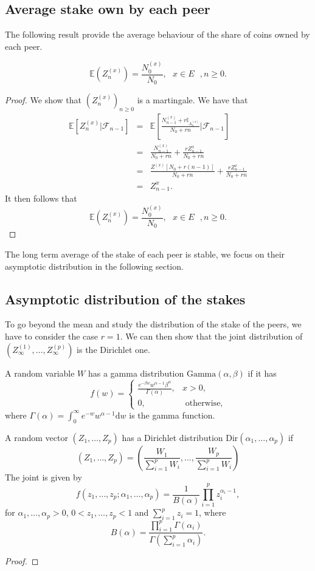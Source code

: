 \subsection{Average stake own by each peer}
The following result provide the average behaviour of the share of coins owned by each peer.
\begin{prop}\label{prop:average_stakes}
$$
\mathbb{E}(Z_n^{(x)}) = \frac{N_0^{(x)}}{N_0},\text{ }x\in E\text{ }, n\geq0.
$$
\end{prop}
\begin{proof}
We show that $(Z_n^{(x)})_{n\geq0}$ is a martingale. We have that 
\begin{eqnarray*}
\mathbb{E}\left[Z_n^{(x)}|\mathcal{F}_{n-1}\right]&=& \mathbb{E}\left[\frac{N^{(x)}_{n-1} + r\mathbb{I}_{A_n^{(x)}}}{N_0 + rn}\Big \rvert\mathcal{F}_{n-1}\right]\\
&=& \frac{N^{(x)}_{n-1} }{N_0 + rn}+\frac{rZ_{n-1}^{x}}{N_0 + rn}\\\
&=& \frac{Z^{(x)}[N_0 + r(n-1)]}{N_0 + rn}+\frac{rZ_{n-1}^{x}}{N_0 + rn}\\
&=&Z_{n-1}^{x}.
\end{eqnarray*}
It then follows that 
$$
\mathbb{E}(Z_n^{(x)}) = \frac{N_0^{(x)}}{N_0},\text{ }x\in E\text{ }, n\geq0.
$$
\end{proof}
The long term average of the stake of each peer is stable, we focus on their asymptotic distribution in the following section.
\subsection{Asymptotic distribution of the stakes}\label{ssec:stakes_distribution}
To go beyond the mean and study the distribution of the stake of the peers, we have to consider the case $r = 1$. We can then show that the joint distribution of $(Z_\infty^{(1)},\ldots,  Z_\infty^{(p)})$ is the Dirichlet one. 
\begin{definition}\label{def:dirichlet}
A random variable $W$ has a gamma distribution $\text{Gamma}(\alpha,\beta)$ if it has \pdf
\[
f(w) = 
\begin{cases}
\frac{e^{-\beta w}w^{\alpha-1}\beta^{\alpha}}{\Gamma(\alpha)},& x>0, \\
0,&\text{ otherwise}, 
\end{cases}
\]
where $\Gamma(\alpha) = \int_0^{\infty}e^{-w}w^{\alpha-1}\text{d}w$ is the gamma function.
\end{definition}
\begin{definition}\label{def:dirichlet}
A random vector $(Z_1,\ldots, Z_p)$ has a Dirichlet distribution $\text{Dir}(\alpha_1,\ldots, \alpha_p)$ if 
\[
(Z_1,\ldots, Z_p) = \left(\frac{W_1}{\sum_{i = 1}^{p}W_i},\ldots, \frac{W_p}{\sum_{i = 1}^{p}W_i}\right)
\]
The joint \pdf is given by
$$
f(z_1,\ldots, z_p;\alpha_1,\ldots, \alpha_p) = \frac{1}{B(\alpha)}\prod_{i=1}^p z_i^{\alpha_i-1}, 
$$
for $\alpha_1,\ldots, \alpha_p>0$, $0< z_1,\ldots, z_p <1$ and $\sum_{i=1}^pz_i=1$, where 
$$
B(\alpha) = \frac{\prod_{i = 1}^p \Gamma(\alpha_i)}{\Gamma(\sum_{i=1}^p \alpha_i)}.
$$
\end{definition}
\begin{proof}
\end{proof}

